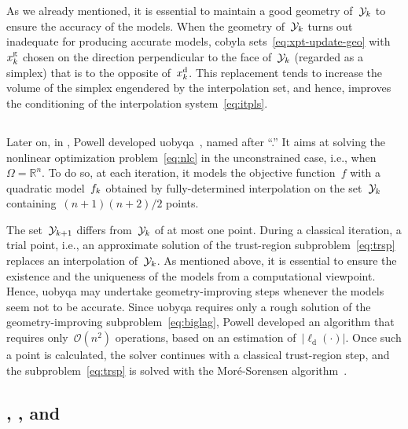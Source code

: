 \documentclass[11pt,draft]{article}
\numberwithin{equation}{section}
\newcommand{\R}{\mathbb{R}}
\newcommand{\abs}[2][]{#1\lvert#2#1\rvert}
\newcommand{\drop}{{\text{d}}}
\newcommand{\fset}{\Omega}
\newcommand{\geo}{{\text{g}}}
\newcommand{\iter}[1][k]{x\ifthenelse{\equal{#1}{}}{}{_{#1}}}
\newcommand{\obj}{f}
\newcommand{\objm}[1][k]{\obj\ifthenelse{\equal{#1}{}}{}{_{#1}}}
\newcommand{\xpt}[1][k]{\mathcal{Y}\ifthenelse{\equal{#1}{}}{}{_{#1}}}
\begin{document}
As we already mentioned, it is essential to maintain a good geometry of~$\xpt$ to ensure the accuracy of the models.
When the geometry of~$\xpt$ turns out inadequate for producing accurate models, \gls{cobyla} sets~\cref{eq:xpt-update-geo} with~$\iter^{\geo}$ chosen on the direction perpendicular to the face of~$\xpt$ (regarded as a simplex) that is to the opposite of~$\iter^{\drop}$.
This replacement tends to increase the volume of the simplex engendered by the interpolation set, and hence, improves the conditioning of the interpolation system~\cref{eq:itpls}.

\subsection{}
\label{ssec:uobyqa}

Later on, in , Powell developed \gls{uobyqa}~\cite{Powell_2002}, named after \enquote{.}
It aims at solving the nonlinear optimization problem~\cref{eq:nlc} in the unconstrained case, i.e., when~$\fset = \R^n$.
To do so, at each iteration, it models the objective function~$\obj$ with a quadratic model~$\objm$ obtained by fully-determined interpolation on the set~$\xpt$ containing~$(n + 1)(n + 2) / 2$ points.

The set~$\xpt[k + 1]$ differs from~$\xpt$ of at most one point.
During a classical iteration, a trial point, i.e., an approximate solution of the trust-region subproblem~\cref{eq:trsp} replaces an interpolation of~$\xpt$.
As mentioned above, it is essential to ensure the existence and the uniqueness of the models from a computational viewpoint.
Hence, \gls{uobyqa} may undertake geometry-improving steps whenever the models seem not to be accurate.
Since \gls{uobyqa} requires only a rough solution of the geometry-improving subproblem~\cref{eq:biglag}, Powell developed an algorithm that requires only~$\mathcal{O}(n^2)$ operations, based on an estimation of~$\abs{\ell_{\drop}(\cdot)}$.
Once such a point is calculated, the solver continues with a classical trust-region step, and the subproblem~\cref{eq:trsp} is solved with the Mor{\'{e}}-Sorensen algorithm~\cite{More_Sorensen_1983}.

\subsection{, , and }
\label{ssec:nbloa}
\end{document}
